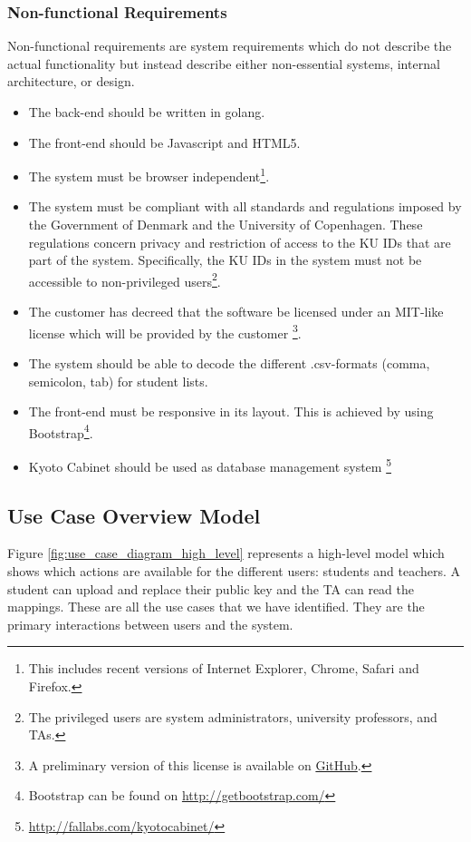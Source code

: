 \documentclass[11pt,a4paper]{report}
\begin{document}
\subsubsection{Non-functional Requirements}\label{subsubsec:Non_Functional_Req}
Non-functional requirements are system requirements which do not describe the actual functionality but instead describe either non-essential systems, internal architecture, or design.
\begin{itemize}
\item The back-end should be written in golang.
\item The front-end should be Javascript and HTML5.
\item The system must be browser independent\footnote{This includes recent versions of Internet Explorer, Chrome, Safari and Firefox.}.
\item The system must be compliant with all standards and regulations imposed by the Government of Denmark and the University of Copenhagen. These regulations concern privacy and restriction of access to the KU IDs that are part of the system. Specifically, the KU IDs in the system must not be accessible to non-privileged users\footnote{The privileged users are system administrators, university professors, and TAs.}.
\item The customer has decreed that the software be licensed under an MIT-like license which will be provided by the customer
\footnote{A preliminary version of this license is available on \href{https://github.com/oleks/sandstone/blob/master/LICENSE}{GitHub}.}.
\item The system should be able to decode the different .csv-formats (comma, semicolon, tab) for student lists.
\item The front-end must be responsive in its layout. This is achieved by using Bootstrap\footnote{Bootstrap can be found on \href{http://getbootstrap.com/}{http://getbootstrap.com/}}.
\item Kyoto Cabinet should be used as database management system \footnote{\href{http://fallabs.com/kyotocabinet/}{http://fallabs.com/kyotocabinet/}}
\end{itemize}

\subsection{Use Case Overview Model}\label{subsec:Use_case_model}

Figure \ref{fig:use_case_diagram_high_level} represents a high-level model which shows which actions are available for the different users: students and teachers. A student can upload and replace their public key and the TA can read the mappings. These are all the use cases that we have identified. They are the primary interactions between users and the system.
\end{document}
